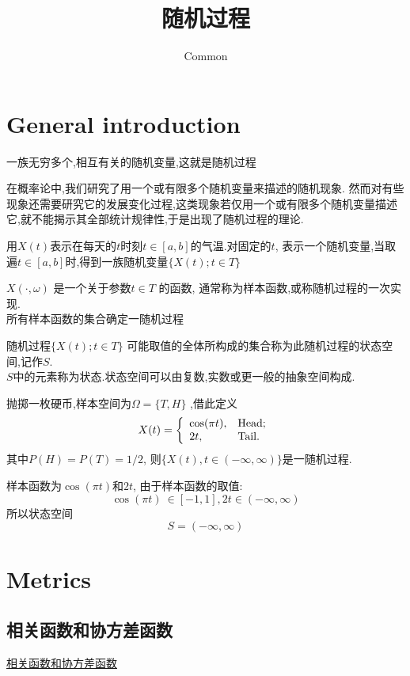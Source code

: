 \documentclass{article}
\begin{document}
\title{随机过程}
\author{Common}
\maketitle
\tableofcontents
\newpage

\section{General introduction}
一族无穷多个,相互有关的随机变量,这就是随机过程

在概率论中,我们研究了用一个或有限多个随机变量来描述的随机现象.
然而对有些现象还需要研究它的发展变化过程,这类现象若仅用一个或有限多个随机变量描述它,就不能揭示其全部统计规律性,于是出现了随机过程的理论.
\begin{example}
用$X(t)$表示在每天的$t$时刻$t \in [a, b]$的气温.对固定的$t$,
表示一个随机变量,当取遍$t \in [a,b ]$时,得到一族随机变量$\{X(t); t \in T\}$
\end{example}

$X(\cdot, \omega)$ 是一个关于参数$t \in T$ 的函数, 通常称为样本函数,或称随机过程的一次实现.\\
所有样本函数的集合确定一随机过程

随机过程$\{X(t);t \in T\}$ 可能取值的全体所构成的集合称为此随机过程的状态空间,记作$S$.\\
$S$中的元素称为状态.状态空间可以由复数,实数或更一般的抽象空间构成.

\begin{example}
抛掷一枚硬币,样本空间为$\Omega = \{T, H\}$ ,借此定义
$$
X(t)=
\left\{
  \begin{array}{ll}
   \cos(\pi t) , & \hbox{Head;} \\
    2t, & \hbox{Tail.}
  \end{array}
\right.
$$
其中$P(H)=P(T)=1/2$, 则$\{X(t), t \in (-\infty, \infty)\}$是一随机过程.

样本函数为$\cos(\pi t)$和$2t$, 由于样本函数的取值:
$$\cos(\pi t)\ \in [-1,1], 2t \in (-\infty, \infty)$$
所以状态空间
$$S=(-\infty, \infty)$$
\end{example}

\section{Metrics}
\subsection{相关函数和协方差函数}
\href{http://202.117.122.42:9001/xhxt/xhyxt/xuexi/chart9/c\_9\_3\_2\_001.htm}{相关函数和协方差函数}
\end{document}
